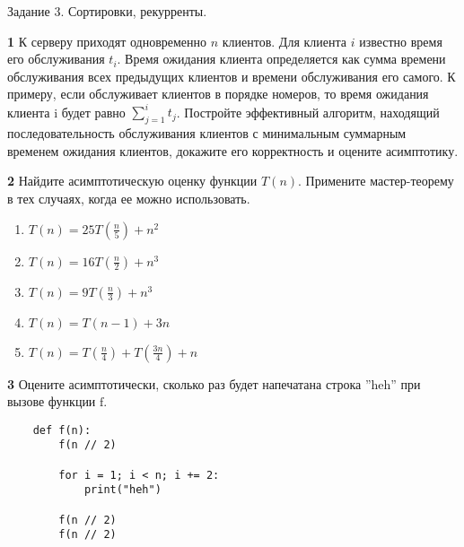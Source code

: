 \documentclass{article}
\begin{document}
\begin{center}
\Large {Задание 3. Сортировки, рекурренты.}
\end{center}

\bigskip

\textbf{1} К серверу приходят одновременно $n$ клиентов.
Для клиента $i$ известно время его обслуживания $t_i$.
Время ожидания клиента определяется как сумма времени обслуживания всех предыдущих клиентов и времени обслуживания его самого.
К примеру, если обслуживает клиентов в порядке номеров, то время ожидания клиента i будет равно $\sum_{j=1}^i t_j$.
Постройте эффективный алгоритм, находящий последовательность обслуживания клиентов с минимальным суммарным временем ожидания клиентов, докажите его корректность и оцените асимптотику.

\medskip

\textbf{2} Найдите асимптотическую оценку функции $T(n)$. Примените мастер-теорему в тех случаях, когда ее можно использовать.

\begin{enumerate}
    \item $T(n) = 25 T(\frac{n}{5}) + n^2$
    \item $T(n) = 16 T(\frac{n}{2}) + n^3$
    \item $T(n) = 9 T(\frac{n}{3}) + n^3$
    \item $T(n) = T(n-1) + 3n$
    \item $T(n) = T(\frac{n}{4}) + T(\frac{3n}{4}) + n$
\end{enumerate}

\medskip

\textbf{3} Оцените асимптотически, сколько раз будет напечатана строка ''heh'' при вызове функции $\text{f}$.

\begin{verbatim}
    def f(n):
        f(n // 2)
        
        for i = 1; i < n; i += 2:
            print("heh")

        f(n // 2)
        f(n // 2)
\end{verbatim}
\end{document}
